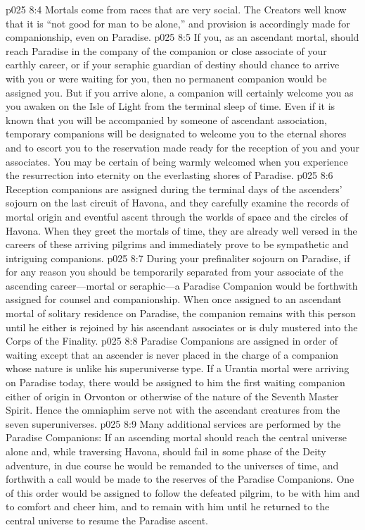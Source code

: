 \vs p025 8:4 Mortals come from races that are very social. The Creators well know that it is “not good for man to be alone,” and provision is accordingly made for companionship, even on Paradise.
\pc \vs p025 8:5 If you, as an ascendant mortal, should reach Paradise in the company of the companion or close associate of your earthly career, or if your seraphic guardian of destiny should chance to arrive with you or were waiting for you, then no permanent companion would be assigned you. But if you arrive alone, a companion will certainly welcome you as you awaken on the Isle of Light from the terminal sleep of time. Even if it is known that you will be accompanied by someone of ascendant association, temporary companions will be designated to welcome you to the eternal shores and to escort you to the reservation made ready for the reception of you and your associates. You may be certain of being warmly welcomed when you experience the resurrection into eternity on the everlasting shores of Paradise.\plusone
\vs p025 8:6 Reception companions are assigned during the terminal days of the ascenders’ sojourn on the last circuit of Havona, and they carefully examine the records of mortal origin and eventful ascent through the worlds of space and the circles of Havona. When they greet the mortals of time, they are already well versed in the careers of these arriving pilgrims and immediately prove to be sympathetic and intriguing companions.
\vs p025 8:7 During your prefinaliter sojourn on Paradise, if for any reason you should be temporarily separated from your associate of the ascending career---mortal or seraphic---a Paradise Companion would be forthwith assigned for counsel and companionship. When once assigned to an ascendant mortal of solitary residence on Paradise, the companion remains with this person until he either is rejoined by his ascendant associates or is duly mustered into the Corps of the Finality.
\pc \vs p025 8:8 Paradise Companions are assigned in order of waiting except that an ascender is never placed in the charge of a companion whose nature is unlike his superuniverse type. If a Urantia mortal were arriving on Paradise today, there would be assigned to him the first waiting companion either of origin in Orvonton or otherwise of the nature of the Seventh Master Spirit. Hence the omniaphim serve not with the ascendant creatures from the seven superuniverses.\plusone
\pc \vs p025 8:9 Many additional services are performed by the Paradise Companions: If an ascending mortal should reach the central universe alone and, while traversing Havona, should fail in some phase of the Deity adventure, in due course he would be remanded to the universes of time, and forthwith a call would be made to the reserves of the Paradise Companions. One of this order would be assigned to follow the defeated pilgrim, to be with him and to comfort and cheer him, and to remain with him until he returned to the central universe to resume the Paradise ascent.\plusone
